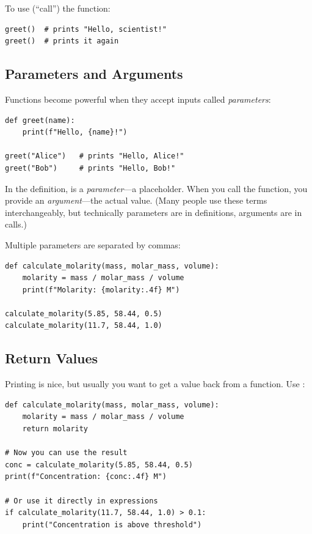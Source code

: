To use (``call'') the function:

\begin{lstlisting}
greet()  # prints "Hello, scientist!"
greet()  # prints it again
\end{lstlisting}

\subsection{Parameters and Arguments}

Functions become powerful when they accept inputs called \emph{parameters}:

\begin{lstlisting}
def greet(name):
    print(f"Hello, {name}!")

greet("Alice")   # prints "Hello, Alice!"
greet("Bob")     # prints "Hello, Bob!"
\end{lstlisting}

In the definition,  is a \emph{parameter}---a placeholder. When you call the function, you provide an \emph{argument}---the actual value. (Many people use these terms interchangeably, but technically parameters are in definitions, arguments are in calls.)

Multiple parameters are separated by commas:

\begin{lstlisting}
def calculate_molarity(mass, molar_mass, volume):
    molarity = mass / molar_mass / volume
    print(f"Molarity: {molarity:.4f} M")

calculate_molarity(5.85, 58.44, 0.5)
calculate_molarity(11.7, 58.44, 1.0)
\end{lstlisting}

\subsection{Return Values}

Printing is nice, but usually you want to get a value back from a function. Use :

\begin{lstlisting}
def calculate_molarity(mass, molar_mass, volume):
    molarity = mass / molar_mass / volume
    return molarity

# Now you can use the result
conc = calculate_molarity(5.85, 58.44, 0.5)
print(f"Concentration: {conc:.4f} M")

# Or use it directly in expressions
if calculate_molarity(11.7, 58.44, 1.0) > 0.1:
    print("Concentration is above threshold")
\end{lstlisting}

